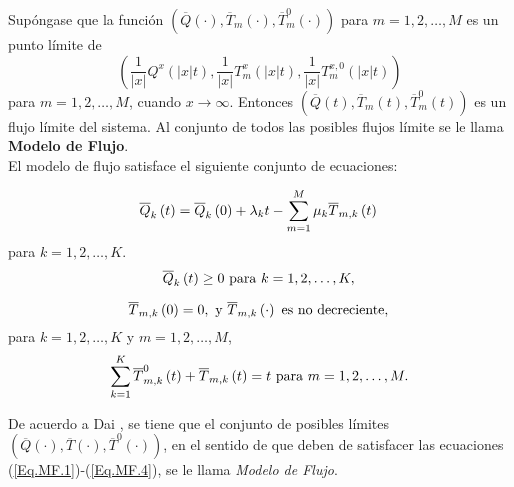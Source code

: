 Sup\'ongase que la funci\'on
$\left(\overline{Q}\left(\cdot\right),\overline{T}_{m}
\left(\cdot\right),\overline{T}_{m}^{0} \left(\cdot\right)\right)$
para $m=1,2,\ldots,M$ es un punto l\'imite de
\begin{equation}\label{Eq.Punto.Limite}
\left(\frac{1}{|x|}Q^{x}\left(|x|t\right),\frac{1}{|x|}T_{m}^{x}\left(|x|t\right),\frac{1}{|x|}T_{m}^{x,0}\left(|x|t\right)\right)
\end{equation}
para $m=1,2,\ldots,M$, cuando $x\rightarrow\infty$. Entonces
$\left(\overline{Q}\left(t\right),\overline{T}_{m}
\left(t\right),\overline{T}_{m}^{0} \left(t\right)\right)$ es un
flujo l\'imite del sistema. Al conjunto de todos las posibles
flujos l\'imite se le llama \textbf{Modelo de Flujo}.\\

El modelo de flujo satisface el siguiente conjunto de ecuaciones:

\begin{equation}\label{Eq.MF.1}
\overline{Q}_{k}\left(t\right)=\overline{Q}_{k}\left(0\right)+\lambda_{k}t-\sum_{m=1}^{M}\mu_{k}\overline{T}_{m,k}\left(t\right)\\
\end{equation}
para $k=1,2,\ldots,K$.\\
\begin{equation}\label{Eq.MF.2}
\overline{Q}_{k}\left(t\right)\geq0\textrm{ para
}k=1,2,\ldots,K,\\
\end{equation}

\begin{equation}\label{Eq.MF.3}
\overline{T}_{m,k}\left(0\right)=0,\textrm{ y }\overline{T}_{m,k}\left(\cdot\right)\textrm{ es no decreciente},\\
\end{equation}
para $k=1,2,\ldots,K$ y $m=1,2,\ldots,M$,\\
\begin{equation}\label{Eq.MF.4}
\sum_{k=1}^{K}\overline{T}_{m,k}^{0}\left(t\right)+\overline{T}_{m,k}\left(t\right)=t\textrm{
para }m=1,2,\ldots,M.\\
\end{equation}

De acuerdo a Dai \cite{Dai}, se tiene que el conjunto de posibles
l\'imites
$\left(\overline{Q}\left(\cdot\right),\overline{T}\left(\cdot\right),\overline{T}^{0}\left(\cdot\right)\right)$,
en el sentido de que deben de satisfacer las ecuaciones
(\ref{Eq.MF.1})-(\ref{Eq.MF.4}), se le llama {\em Modelo de
Flujo}.



